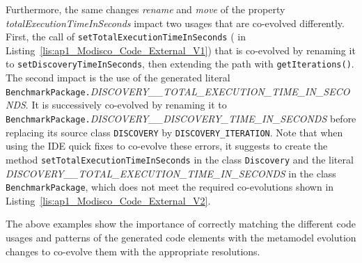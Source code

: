 Furthermore, the same changes \textit{rename} and \textit{move} of the property \emph{totalExecutionTimeInSeconds} impact two usages that are co-evolved differently. First, the call of \texttt{setTotalExecutionTimeInSeconds} ({\small{}} in Listing~\ref{lis:ap1_Modisco_Code_External_V1}) that is co-evolved by renaming it to \texttt{setDiscoveryTimeInSeconds}, then extending the path with \texttt{getIterations()}. The second impact is the use of the generated literal \texttt{BenchmarkPackage.}\emph{\footnotesize{DISCOVERY\_\_TOTAL\_EXECUTION\_TIME\_IN\_SECONDS}}. It is successively co-evolved by renaming it to \texttt{BenchmarkPackage.}\emph{\footnotesize{DISCOVERY\_\_DISCOVERY\_TIME\_IN\_SECONDS}} before replacing its source class \texttt{DISCOVERY} by \texttt{DISCOVERY\_ITERATION}. 
Note that when using the IDE quick fixes to co-evolve these errors, it suggests to create the method \texttt{setTotalExecutionTimeInSeconds} in the class \texttt{Discovery} and the literal \emph{\footnotesize{DISCOVERY\_\_TOTAL\_EXECUTION\_TIME\_IN\_SECONDS}} in the class \texttt{BenchmarkPackage}, which does not meet the required co-evolutions shown in Listing~\ref{lis:ap1_Modisco_Code_External_V2}.

The above examples show the importance of correctly matching the different code usages and patterns of the generated code elements with the metamodel evolution changes to co-evolve them with the appropriate resolutions. 


